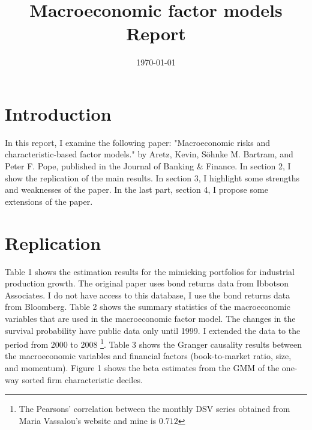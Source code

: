 \documentclass[12pt,a4paper]{ouparticle}
\begin{document}
\title{%
  Macroeconomic factor models   \\
  \large Report}

\author{%
}

\date{\today}

\maketitle


\section{Introduction}
In this report, I examine the following paper: "Macroeconomic risks and characteristic-based factor models." by Aretz, Kevin, Söhnke M. Bartram, and Peter F. Pope, published in the Journal of Banking \& Finance. In section 2, I show the replication of the main results. In section 3, I highlight some strengths and weaknesses of the paper. In the last part, section 4, I propose some extensions of the paper. 


\section{Replication}
Table 1 shows the estimation results for the mimicking portfolios for industrial production growth. The original paper uses bond returns data from Ibbotson Associates. I do not have access to this database, I use the bond returns data from Bloomberg. Table 2 shows the summary statistics of the macroeconomic variables that are used in the macroeconomic factor model. The changes in the survival probability have public data only until 1999. I extended the data to the period from 2000 to 2008 \footnote{The Pearsons' correlation between the monthly DSV series obtained from Maria Vassalou’s website and mine is $0.712$}. Table 3 shows the Granger causality results between the macroeconomic variables and financial factors (book-to-market ratio, size, and momentum). Figure 1 shows the beta estimates from the GMM of the one-way sorted firm characteristic deciles. 
\end{document}
